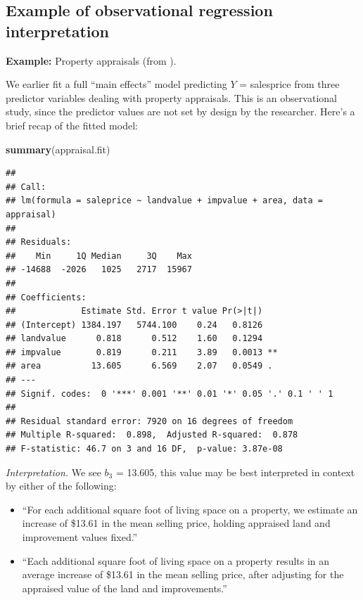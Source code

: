 \documentclass[
]{book}
\newenvironment{Shaded}{\begin{snugshade}}{\end{snugshade}}
\newcommand{\FunctionTok}[1]{\textcolor[rgb]{0.13,0.29,0.53}{\textbf{#1}}}
\newcommand{\NormalTok}[1]{#1}
\providecommand{\tightlist}{%
  \setlength{\itemsep}{0pt}\setlength{\parskip}{0pt}}
\begin{document}
\hypertarget{example-of-observational-regression-interpretation}{%
\subsection{Example of observational regression interpretation}\label{example-of-observational-regression-interpretation}}

\textbf{Example:} Property appraisals (from \citet{McClaveSincich2008}).

We earlier fit a full ``main effects'' model predicting \(Y\) = salesprice from three predictor variables dealing with property appraisals.
This is an observational study, since the predictor values are not set by design by the researcher.
Here's a brief recap of the fitted model:

\begin{Shaded}
\begin{Highlighting}[]
\FunctionTok{summary}\NormalTok{(appraisal.fit)}
\end{Highlighting}
\end{Shaded}

\begin{verbatim}
## 
## Call:
## lm(formula = saleprice ~ landvalue + impvalue + area, data = appraisal)
## 
## Residuals:
##    Min     1Q Median     3Q    Max 
## -14688  -2026   1025   2717  15967 
## 
## Coefficients:
##             Estimate Std. Error t value Pr(>|t|)   
## (Intercept) 1384.197   5744.100    0.24   0.8126   
## landvalue      0.818      0.512    1.60   0.1294   
## impvalue       0.819      0.211    3.89   0.0013 **
## area          13.605      6.569    2.07   0.0549 . 
## ---
## Signif. codes:  0 '***' 0.001 '**' 0.01 '*' 0.05 '.' 0.1 ' ' 1
## 
## Residual standard error: 7920 on 16 degrees of freedom
## Multiple R-squared:  0.898,  Adjusted R-squared:  0.878 
## F-statistic: 46.7 on 3 and 16 DF,  p-value: 3.87e-08
\end{verbatim}

\emph{Interpretation.} We see \(b_3\) = 13.605, this value may be best interpreted in context by either of the following:

\begin{itemize}
\tightlist
\item
  ``For each additional square foot of living space on a property, we estimate an increase of \$13.61 in the mean selling price, holding appraised land and improvement values fixed.''
\item
  ``Each additional square foot of living space on a property results in an average increase of \$13.61 in the mean selling price, after adjusting for the appraised value of the land and improvements.''
\end{itemize}
\end{document}
